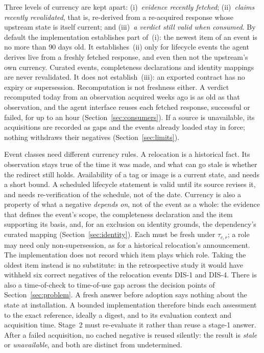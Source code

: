 \documentclass[11pt,a4paper]{article}
\begin{document}
Three levels of currency are kept apart: (i)~\emph{evidence recently
fetched}; (ii)~\emph{claims recently revalidated}, that is, re-derived
from a re-acquired response whose upstream state is itself current;
and (iii)~\emph{a verdict still valid when consumed}. By default the
implementation establishes part of~(i): the newest item of an event is
no more than 90 days old. It establishes~(ii) only for lifecycle
events the agent derives live from a freshly fetched response, and
even then not the upstream's own currency. Curated events,
completeness declarations and identity mappings are never revalidated.
It does not establish~(iii): an exported contract has no expiry or
supersession. Recomputation is not freshness either. A verdict
recomputed today from an observation acquired weeks ago is as old as
that observation, and the agent interface reuses each fetched
response, successful or failed, for up to an hour
(Section~\ref{sec:consumers}). If a source is unavailable, its
acquisitions are recorded as gaps and the events already loaded stay
in force; nothing withdraws their negatives
(Section~\ref{sec:limits}).

Event classes need different currency rules. A relocation is a
historical fact. Its observation stays true of the time it was made,
and what can go stale is whether the redirect still holds. Availability
of a tag or image is a current state, and needs a short bound. A
scheduled lifecycle statement is valid until its source revises it, and
needs re-verification of the schedule, not of the date. Currency is
also a property of what a negative \emph{depends on}, not of the event
as a whole: the evidence that defines the event's scope, the
completeness declaration and the item supporting its basis, and, for
an exclusion on identity grounds, the dependency's curated mapping
(Section~\ref{sec:identity}). Each must be fresh under
$\tau_{c,r}$; a role may need only non-supersession, as for a
historical relocation's announcement. The implementation does not
record which item plays which role. Taking the oldest item instead is
no substitute: in the retrospective study it would have withheld six
correct negatives of the relocation events DIS-1 and DIS-4. There is also
a time-of-check to time-of-use gap across the decision points of
Section~\ref{sec:problem}. A fresh answer before adoption says nothing
about the state at installation. A bounded implementation therefore
binds each assessment to the exact reference, ideally a digest, and to
its evaluation context and acquisition time. Stage~2 must re-evaluate
it rather than reuse a stage-1 answer. After a failed acquisition, no
cached negative is reused silently: the result is \emph{stale} or
\emph{unavailable}, and both are distinct from undetermined.
\end{document}
